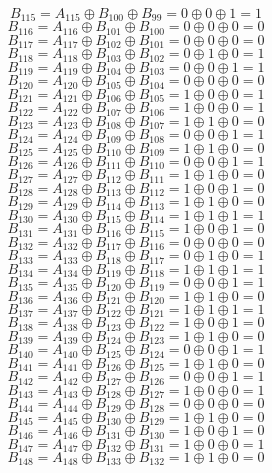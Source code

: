 \documentclass[12pt,onecolumn]{article}
\begin{document}
$$B_{115} = A_{115} \oplus B_{100} \oplus B_{99} = 0 \oplus 0 \oplus 1 = 1$$
$$B_{116} = A_{116} \oplus B_{101} \oplus B_{100} = 0 \oplus 0 \oplus 0 = 0$$
$$B_{117} = A_{117} \oplus B_{102} \oplus B_{101} = 0 \oplus 0 \oplus 0 = 0$$
$$B_{118} = A_{118} \oplus B_{103} \oplus B_{102} = 0 \oplus 1 \oplus 0 = 1$$
$$B_{119} = A_{119} \oplus B_{104} \oplus B_{103} = 0 \oplus 0 \oplus 1 = 1$$
$$B_{120} = A_{120} \oplus B_{105} \oplus B_{104} = 0 \oplus 0 \oplus 0 = 0$$
$$B_{121} = A_{121} \oplus B_{106} \oplus B_{105} = 1 \oplus 0 \oplus 0 = 1$$
$$B_{122} = A_{122} \oplus B_{107} \oplus B_{106} = 1 \oplus 0 \oplus 0 = 1$$
$$B_{123} = A_{123} \oplus B_{108} \oplus B_{107} = 1 \oplus 1 \oplus 0 = 0$$
$$B_{124} = A_{124} \oplus B_{109} \oplus B_{108} = 0 \oplus 0 \oplus 1 = 1$$
$$B_{125} = A_{125} \oplus B_{110} \oplus B_{109} = 1 \oplus 1 \oplus 0 = 0$$
$$B_{126} = A_{126} \oplus B_{111} \oplus B_{110} = 0 \oplus 0 \oplus 1 = 1$$
$$B_{127} = A_{127} \oplus B_{112} \oplus B_{111} = 1 \oplus 1 \oplus 0 = 0$$
$$B_{128} = A_{128} \oplus B_{113} \oplus B_{112} = 1 \oplus 0 \oplus 1 = 0$$
$$B_{129} = A_{129} \oplus B_{114} \oplus B_{113} = 1 \oplus 1 \oplus 0 = 0$$
$$B_{130} = A_{130} \oplus B_{115} \oplus B_{114} = 1 \oplus 1 \oplus 1 = 1$$
$$B_{131} = A_{131} \oplus B_{116} \oplus B_{115} = 1 \oplus 0 \oplus 1 = 0$$
$$B_{132} = A_{132} \oplus B_{117} \oplus B_{116} = 0 \oplus 0 \oplus 0 = 0$$
$$B_{133} = A_{133} \oplus B_{118} \oplus B_{117} = 0 \oplus 1 \oplus 0 = 1$$
$$B_{134} = A_{134} \oplus B_{119} \oplus B_{118} = 1 \oplus 1 \oplus 1 = 1$$
$$B_{135} = A_{135} \oplus B_{120} \oplus B_{119} = 0 \oplus 0 \oplus 1 = 1$$
$$B_{136} = A_{136} \oplus B_{121} \oplus B_{120} = 1 \oplus 1 \oplus 0 = 0$$
$$B_{137} = A_{137} \oplus B_{122} \oplus B_{121} = 1 \oplus 1 \oplus 1 = 1$$
$$B_{138} = A_{138} \oplus B_{123} \oplus B_{122} = 1 \oplus 0 \oplus 1 = 0$$
$$B_{139} = A_{139} \oplus B_{124} \oplus B_{123} = 1 \oplus 1 \oplus 0 = 0$$
$$B_{140} = A_{140} \oplus B_{125} \oplus B_{124} = 0 \oplus 0 \oplus 1 = 1$$
$$B_{141} = A_{141} \oplus B_{126} \oplus B_{125} = 1 \oplus 1 \oplus 0 = 0$$
$$B_{142} = A_{142} \oplus B_{127} \oplus B_{126} = 0 \oplus 0 \oplus 1 = 1$$
$$B_{143} = A_{143} \oplus B_{128} \oplus B_{127} = 1 \oplus 0 \oplus 0 = 1$$
$$B_{144} = A_{144} \oplus B_{129} \oplus B_{128} = 0 \oplus 0 \oplus 0 = 0$$
$$B_{145} = A_{145} \oplus B_{130} \oplus B_{129} = 1 \oplus 1 \oplus 0 = 0$$
$$B_{146} = A_{146} \oplus B_{131} \oplus B_{130} = 1 \oplus 0 \oplus 1 = 0$$
$$B_{147} = A_{147} \oplus B_{132} \oplus B_{131} = 1 \oplus 0 \oplus 0 = 1$$
$$B_{148} = A_{148} \oplus B_{133} \oplus B_{132} = 1 \oplus 1 \oplus 0 = 0$$
\end{document}
